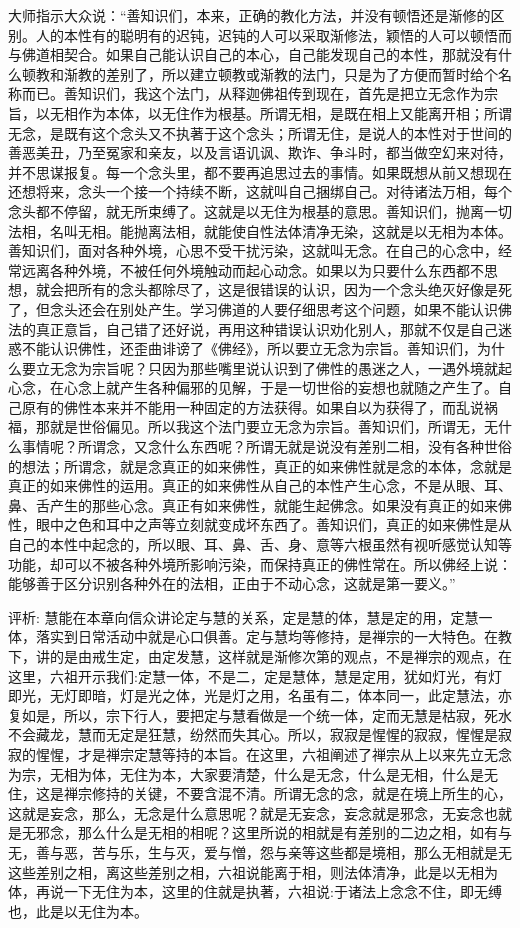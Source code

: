\documentclass[12pt,twoside,openany]{book}
\newcommand{\kai}[1]{{\CJKfamily{kai}#1}}
\begin{document}
{大师指示大众说：“善知识们，本来，正确的教化方法，并没有顿悟还是渐修的区别。人的本性有的聪明有的迟钝，迟钝的人可以采取渐修法，颖悟的人可以顿悟而与佛道相契合。如果自己能认识自己的本心，自己能发现自己的本性，那就没有什么顿教和渐教的差别了，所以建立顿教或渐教的法门，只是为了方便而暂时给个名称而已。善知识们，我这个法门，从释迦佛祖传到现在，首先是把立无念作为宗旨，以无相作为本体，以无住作为根基。所谓无相，是既在相上又能离开相；所谓无念，是既有这个念头又不执著于这个念头；所谓无住，是说人的本性对于世间的善恶美丑，乃至冤家和亲友，以及言语讥讽、欺诈、争斗时，都当做空幻来对待，并不思谋报复。每一个念头里，都不要再追思过去的事情。如果既想从前又想现在还想将来，念头一个接一个持续不断，这就叫自己捆绑自己。对待诸法万相，每个念头都不停留，就无所束缚了。这就是以无住为根基的意思。善知识们，抛离一切法相，名叫无相。能抛离法相，就能使自性法体清净无染，这就是以无相为本体。善知识们，面对各种外境，心思不受干扰污染，这就叫无念。在自己的心念中，经常远离各种外境，不被任何外境触动而起心动念。如果以为只要什么东西都不思想，就会把所有的念头都除尽了，这是很错误的认识，因为一个念头绝灭好像是死了，但念头还会在别处产生。学习佛道的人要仔细思考这个问题，如果不能认识佛法的真正意旨，自己错了还好说，再用这种错误认识劝化别人，那就不仅是自己迷惑不能认识佛性，还歪曲诽谤了《佛经》，所以要立无念为宗旨。善知识们，为什么要立无念为宗旨呢？只因为那些嘴里说认识到了佛性的愚迷之人，一遇外境就起心念，在心念上就产生各种偏邪的见解，于是一切世俗的妄想也就随之产生了。自己原有的佛性本来并不能用一种固定的方法获得。如果自以为获得了，而乱说祸福，那就是世俗偏见。所以我这个法门要立无念为宗旨。善知识们，所谓无，无什么事情呢？所谓念，又念什么东西呢？所谓无就是说没有差别二相，没有各种世俗的想法；所谓念，就是念真正的如来佛性，真正的如来佛性就是念的本体，念就是真正的如来佛性的运用。真正的如来佛性从自己的本性产生心念，不是从眼、耳、鼻、舌产生的那些心念。真正有如来佛性，就能生起佛念。如果没有真正的如来佛性，眼中之色和耳中之声等立刻就变成坏东西了。善知识们，真正的如来佛性是从自己的本性中起念的，所以眼、耳、鼻、舌、身、意等六根虽然有视听感觉认知等功能，却可以不被各种外境所影响污染，而保持真正的佛性常在。所以佛经上说：能够善于区分识别各种外在的法相，正由于不动心念，这就是第一要义。”}

\kai{评析: 慧能在本章向信众讲论定与慧的关系，定是慧的体，慧是定的用，定慧一体，落实到日常活动中就是心口俱善。定与慧均等修持，是禅宗的一大特色。在教下，讲的是由戒生定，由定发慧，这样就是渐修次第的观点，不是禅宗的观点，在这里，六祖开示我们:定慧一体，不是二，定是慧体，慧是定用，犹如灯光，有灯即光，无灯即暗，灯是光之体，光是灯之用，名虽有二，体本同一，此定慧法，亦复如是，所以，宗下行人，要把定与慧看做是一个统一体，定而无慧是枯寂，死水不会藏龙，慧而无定是狂慧，纷然而失其心。所以，寂寂是惺惺的寂寂，惺惺是寂寂的惺惺，才是禅宗定慧等持的本旨。在这里，六祖阐述了禅宗从上以来先立无念为宗，无相为体，无住为本，大家要清楚，什么是无念，什么是无相，什么是无住，这是禅宗修持的关键，不要含混不清。所谓无念的念，就是在境上所生的心，这就是妄念，那么，无念是什么意思呢？就是无妄念，妄念就是邪念，无妄念也就是无邪念，那么什么是无相的相呢？这里所说的相就是有差别的二边之相，如有与无，善与恶，苦与乐，生与灭，爱与憎，怨与亲等这些都是境相，那么无相就是无这些差别之相，离这些差别之相，六祖说能离于相，则法体清净，此是以无相为体，再说一下无住为本，这里的住就是执著，六祖说:于诸法上念念不住，即无缚也，此是以无住为本。}
\end{document}
